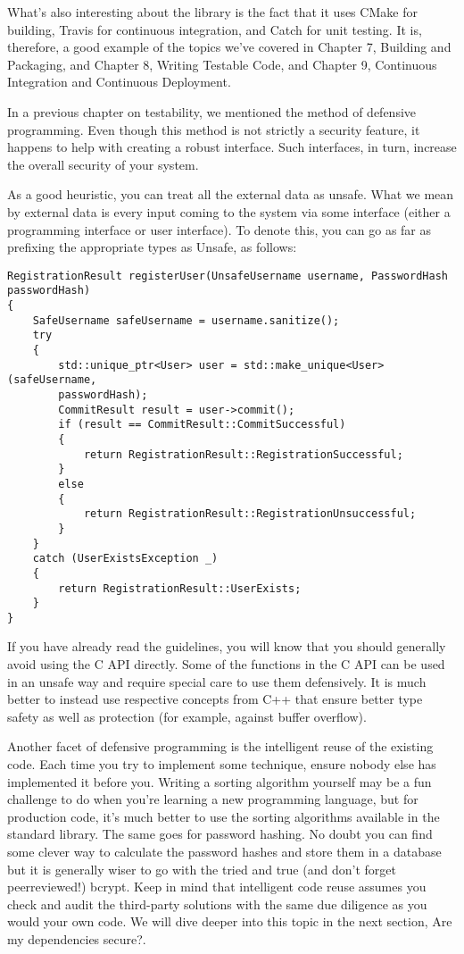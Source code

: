 What's also interesting about the library is the fact that it uses CMake for building, Travis for continuous integration, and Catch for unit testing. It is, therefore, a good example of the topics we've covered in Chapter 7, Building and Packaging, and Chapter 8, Writing Testable Code, and Chapter 9, Continuous Integration and Continuous Deployment.


In a previous chapter on testability, we mentioned the method of defensive programming. Even though this method is not strictly a security feature, it happens to help with creating a robust interface. Such interfaces, in turn, increase the overall security of your system.

As a good heuristic, you can treat all the external data as unsafe. What we mean by external data is every input coming to the system via some interface (either a programming interface or user interface). To denote this, you can go as far as prefixing the appropriate types as Unsafe, as follows:

\begin{lstlisting}[style=styleCXX]
RegistrationResult registerUser(UnsafeUsername username, PasswordHash
passwordHash)
{
	SafeUsername safeUsername = username.sanitize();
	try
	{
		std::unique_ptr<User> user = std::make_unique<User>(safeUsername,
		passwordHash);
		CommitResult result = user->commit();
		if (result == CommitResult::CommitSuccessful)
		{
			return RegistrationResult::RegistrationSuccessful;
		}
		else
		{
			return RegistrationResult::RegistrationUnsuccessful;
		}
	}
	catch (UserExistsException _)
	{
		return RegistrationResult::UserExists;
	}
}
\end{lstlisting}

If you have already read the guidelines, you will know that you should generally avoid using the C API directly. Some of the functions in the C API can be used in an unsafe way and require special care to use them defensively. It is much better to instead use respective concepts from C++ that ensure better type safety as well as protection (for example, against buffer overflow).

Another facet of defensive programming is the intelligent reuse of the existing code. Each time you try to implement some technique, ensure nobody else has implemented it before you. Writing a sorting algorithm yourself may be a fun challenge to do when you're learning a new programming language, but for production code, it's much better to use the sorting algorithms available in the standard library. The same goes for password hashing. No doubt you can find some clever way to calculate the password hashes and store them in a database but it is generally wiser to go with the tried and true (and don't forget peerreviewed!) bcrypt. Keep in mind that intelligent code reuse assumes you check and audit the third-party solutions with the same due diligence as  you would your own code. We will dive deeper into this topic in the next section, Are my dependencies secure?.

